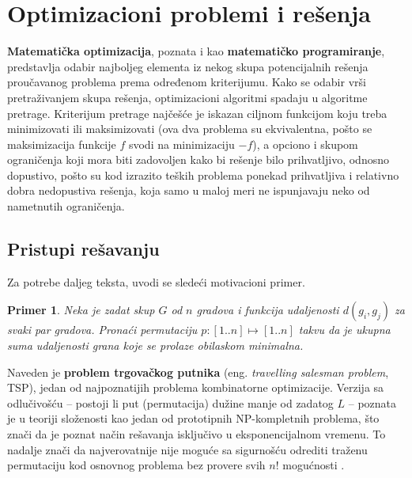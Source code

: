 \documentclass[a4paper]{article}
\newtheorem{primer}{Primer}[section]
\begin{document}
\section{Optimizacioni problemi i rešenja}
\label{sec:optimizacioniProblemi}

\textbf{Matematička optimizacija}, poznata i kao \textbf{matematičko programiranje}, predstavlja odabir najboljeg elementa iz nekog skupa potencijalnih rešenja proučavanog problema prema određenom kriterijumu. Kako se odabir vrši pretraživanjem skupa rešenja, optimizacioni algoritmi spadaju u algoritme pretrage. Kriterijum pretrage najčešće je iskazan ciljnom funkcijom koju treba minimizovati ili maksimizovati (ova dva problema su ekvivalentna, pošto se maksimizacija funkcije $f$ svodi na minimizaciju $-f$), a opciono i skupom ograničenja koji mora biti zadovoljen kako bi rešenje bilo prihvatljivo, odnosno dopustivo, pošto su kod izrazito teških problema ponekad prihvatljiva i relativno dobra nedopustiva rešenja, koja samo u maloj meri ne ispunjavaju neko od nametnutih ograničenja.

\subsection{Pristupi rešavanju}

Za potrebe daljeg teksta, uvodi se sledeći motivacioni primer.

\begin{primer}
Neka je zadat skup $G$ od $n$ gradova i funkcija udaljenosti $d(g_i, g_j)$ za svaki par gradova. Pronaći permutaciju $p: [1..n] \mapsto [1..n]$ takvu da je ukupna suma udaljenosti grana koje se prolaze obilaskom minimalna.
\end{primer}

Naveden je \textbf{problem trgovačkog putnika} (eng. \textit{travelling salesman problem}, TSP), jedan od najpoznatijih problema kombinatorne optimizacije. Verzija sa odlučivošću -- postoji li put (permutacija) dužine manje od zadatog $L$  -- poznata je u teoriji složenosti kao jedan od prototipnih NP-kompletnih problema, što znači da je poznat način rešavanja isključivo u eksponencijalnom vremenu. To nadalje znači da najverovatnije nije moguće sa sigurnošću odrediti traženu permutaciju kod osnovnog problema bez provere svih $n!$ mogućnosti \cite{ri}.
\end{document}
